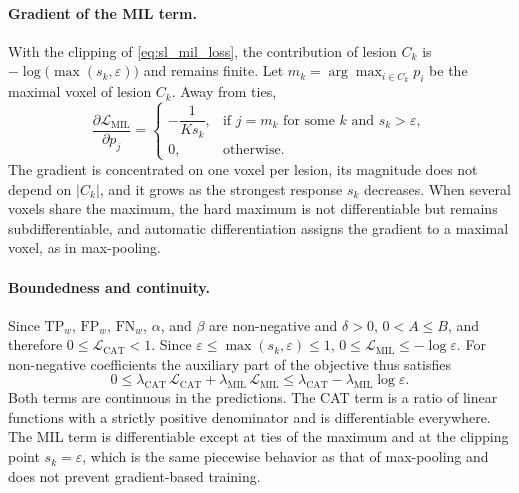 \paragraph{Gradient of the MIL term.}
With the clipping of \cref{eq:sl_mil_loss}, the contribution of lesion
$C_k$ is $-\log\bigl(\max(s_k,\varepsilon)\bigr)$ and remains finite. Let
$m_k = \arg\max_{i \in C_k} p_i$ be the maximal voxel of lesion $C_k$.
Away from ties,
\begin{equation}
\frac{\partial \mathcal{L}_{\mathrm{MIL}}}{\partial p_j}
=
\begin{cases}
-\dfrac{1}{K s_k},
& \text{if } j=m_k \text{ for some } k \text{ and } s_k>\varepsilon, \\[2mm]
0, & \text{otherwise.}
\end{cases}
\end{equation}
The gradient is concentrated on one voxel per lesion, its magnitude does
not depend on $|C_k|$, and it grows as the strongest response $s_k$
decreases. When several voxels share the maximum, the hard maximum is not
differentiable but remains subdifferentiable, and automatic differentiation
assigns the gradient to a maximal voxel, as in max-pooling.

\paragraph{Boundedness and continuity.}
Since $\mathrm{TP}_{w}$, $\mathrm{FP}_{w}$, $\mathrm{FN}_{w}$, $\alpha$, and
$\beta$ are non-negative and $\delta>0$, $0 < A \leq B$, and therefore
$0 \leq \mathcal{L}_{\mathrm{CAT}} < 1$. Since
$\varepsilon \leq \max(s_k,\varepsilon) \leq 1$,
$0 \leq \mathcal{L}_{\mathrm{MIL}} \leq -\log \varepsilon$. For
non-negative coefficients the auxiliary part of the objective thus
satisfies
\begin{equation}
0
\leq
\lambda_{\mathrm{CAT}}\, \mathcal{L}_{\mathrm{CAT}}
+
\lambda_{\mathrm{MIL}}\, \mathcal{L}_{\mathrm{MIL}}
\leq
\lambda_{\mathrm{CAT}} - \lambda_{\mathrm{MIL}} \log \varepsilon .
\end{equation}
Both terms are continuous in the predictions. The CAT term is a ratio of
linear functions with a strictly positive denominator and is differentiable
everywhere. The MIL term is differentiable except at ties of the maximum
and at the clipping point $s_k=\varepsilon$, which is the same piecewise
behavior as that of max-pooling and does not prevent gradient-based
training.
